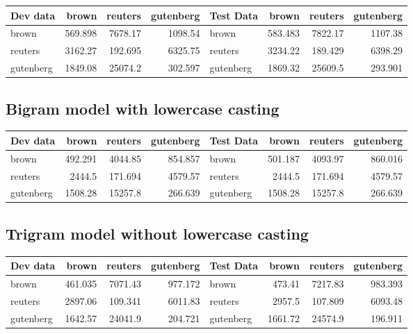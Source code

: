 \documentclass{article}
\begin{document}
\begin{tabular}{lrrr|lrrr}
\hline
Dev data   &    brown &   reuters &   gutenberg & Test Data &     brown &   reuters &   gutenberg \\
\hline
 brown     &  569.898 &  7678.17  &    1098.54  & brown     &  583.483  &  7822.17  &    1107.38  \\
 reuters   & 3162.27  &   192.695 &    6325.75  & reuters   & 3234.22   &   189.429 &    6398.29  \\
 gutenberg & 1849.08  & 25074.2   &     302.597 & gutenberg & 1869.32   & 25609.5   &     293.901 \\
\hline
\end{tabular}

\subsection{Bigram model with lowercase casting}

\begin{tabular}{lrrr|lrrr}
\hline
Dev data   &    brown &   reuters &   gutenberg & Test Data &     brown &   reuters &   gutenberg \\
\hline
 brown     &  492.291 &  4044.85  &     854.857 & brown     &  501.187 &  4093.97  &     860.016 \\
 reuters   & 2444.5   &   171.694 &    4579.57  & reuters   & 2444.5   &   171.694 &    4579.57  \\
 gutenberg & 1508.28  & 15257.8   &     266.639 & gutenberg & 1508.28  & 15257.8   &     266.639 \\
\hline
\end{tabular}

\subsection{Trigram model without lowercase casting}

\begin{tabular}{lrrr|lrrr}
\hline
Dev data   &    brown &   reuters &   gutenberg & Test Data &     brown &   reuters &   gutenberg \\
\hline
 brown     &  461.035 &  7071.43  &     977.172 & brown     &  473.41 &  7217.83  &     983.393 \\
 reuters   & 2897.06  &   109.341 &    6011.83  & reuters   & 2957.5  &   107.809 &    6093.48  \\
 gutenberg & 1642.57  & 24041.9   &     204.721 & gutenberg & 1661.72 & 24574.9   &     196.911 \\
\hline
\end{tabular}
\end{document}
